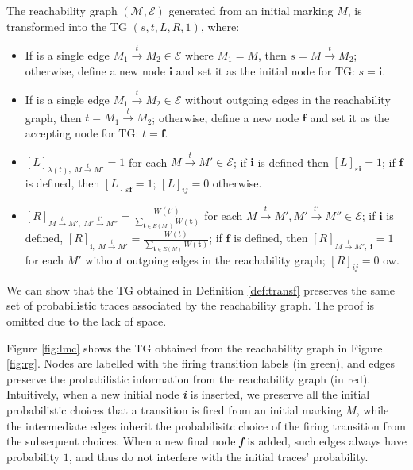 \begin{definition}\label{def:transf}
The reachability graph $(\mathcal{M},\mathcal{E})$ generated from an initial marking $M$, is transformed into the TG $(s,t,L,R,1)$, where:
\begin{itemize}
	\item If is a single edge $M_1\overset{t}{\to}M_2\in\mathcal{E}$ where $M_1=M$, then $s=M\overset{t}{\to}M_2$; otherwise, define a new node $\textbf{i}$ and set it as the initial node for TG: $s=\textbf{i}$.
	\item If is a single edge $M_1\overset{t}{\to}M_2\in\mathcal{E}$ without outgoing edges in the reachability graph, then $t=M_1\overset{t}{\to}M_2$; otherwise, define a new node $\textbf{f}$ and set it as the accepting node for TG:  $t=\textbf{f}$.
	\item $[L]_{\lambda(t),\;M\overset{t}{\to} M'}=1$ for each $M\overset{t}{\to} M'\in\mathcal{E}$; if $\textbf{i}$ is defined then $[L]_{\varepsilon\textbf{i}}=1$; if $\textbf{f}$ is defined, then $[L]_{\varepsilon\textbf{f}}=1$; $[L]_{ij}=0$ otherwise.
	\item $[R]_{M\overset{t}{\to} M',\;M'\overset{t'}{\to} M''}=\frac{W(t')}{\sum_{\textbf{t}\in E(M')}W(\textbf{t})}$ for each $M\overset{t}{\to} M',M'\overset{t'}{\to} M''\in\mathcal{E}$; if $\textbf{i}$ is defined, $[R]_{\textbf{i},\;M\overset{t}{\to}M'}=\frac{W(t)}{\sum_{\textbf{t}\in E(M)}W(\textbf{t})}$; if $\textbf{f}$ is defined, then $[R]_{M\overset{t}{\to}M',\;\textbf{i}}=1$ for each $M'$ without outgoing edges in the reachability graph; $[R]_{ij}=0$ ow.
\end{itemize}
\end{definition}
%
We can show that the TG obtained in Definition \ref{def:transf} preserves the same set of probabilistic traces associated by the reachability graph. The proof is omitted due to the lack of space.

\begin{example}
Figure \ref{fig:lmc} shows the TG obtained from the reachability graph in Figure \ref{fig:rg}. Nodes are labelled with the firing 
transition labels (in green), and edges preserve the probabilistic information from the reachability graph (in red). Intuitively, when a 
new initial node \textit{\textbf{i}} is inserted, we preserve all the initial probabilistic choices that a transition is fired from an initial 
marking $M$, while the intermediate edges inherit the probabilisitc choice of the firing transition from the subsequent choices. When 
a new final node \textit{\textbf{f}} is added, such edges always have probability $1$, and thus do not interfere with the 
initial traces' probability.
\end{example}

